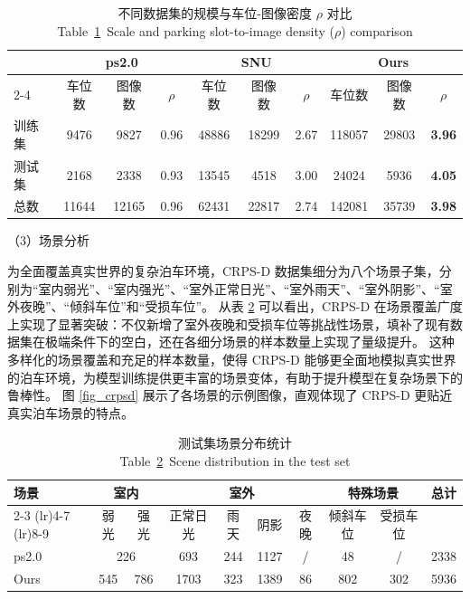 \begin{table}[!t]
\centering
\setlength{\tabcolsep}{1.5mm}
\caption{不同数据集的规模与车位-图像密度 $\rho$ 对比 \\Table~\ref{tab_density}~Scale and parking slot-to-image density ($\rho$) comparison }
\begin{tabular}{lccccccccc}
\toprule
 & \multicolumn{3}{c}{ps2.0\cite{zhang2018vision}} & \multicolumn{3}{c}{SNU\cite{do2020context}} & \multicolumn{3}{c}{Ours} \\\cmidrule{2-4}\cmidrule{5-7}\cmidrule{8-10}%
 
    & 车位数 & 图像数 & $\rho$ & 车位数 & 图像数 & $\rho$ & 车位数 & 图像数 & $\rho$ \\
\midrule
     训练集 & 9476 & 9827 & 0.96 & 48886 & 18299 & 2.67 & 118057 & 29803 & \textbf{3.96}  \\
    测试集 & 2168 & 2338 & 0.93 & 13545 & 4518 & 3.00 & 24024 & 5936 & \textbf{4.05}  \\
    总数 & 11644 & 12165 & 0.96 & 62431 & 22817 & 2.74 & 142081 & 35739 & \textbf{3.98}  \\
\bottomrule
\end{tabular}
\label{tab_density}
\end{table} 


（3）场景分析

为全面覆盖真实世界的复杂泊车环境，CRPS-D 数据集细分为八个场景子集，分别为“室内弱光”、“室内强光”、“室外正常日光”、“室外雨天”、“室外阴影”、“室外夜晚”、“倾斜车位”和“受损车位”。
从表 \ref{tab_sence} 可以看出，CRPS-D 在场景覆盖广度上实现了显著突破：不仅新增了室外夜晚和受损车位等挑战性场景，填补了现有数据集在极端条件下的空白，还在各细分场景的样本数量上实现了量级提升。
这种多样化的场景覆盖和充足的样本数量，使得 CRPS-D 能够更全面地模拟真实世界的泊车环境，为模型训练提供更丰富的场景变体，有助于提升模型在复杂场景下的鲁棒性。
图 \ref{fig_crpsd} 展示了各场景的示例图像，直观体现了 CRPS-D 更贴近真实泊车场景的特点。

\begin{table}[!h]
\centering
\setlength{\tabcolsep}{1.5mm}
\caption{测试集场景分布统计\\
Table~\ref{tab_sence}~Scene distribution in the test set}
\begin{tabular}{lccccccccc}
    \toprule
    \multirow{2}{*}{场景} & \multicolumn{2}{c}{室内} & \multicolumn{4}{c}{室外} & \multicolumn{2}{c}{特殊场景} & \multirow{2}{*}{总计} \\
    \cmidrule(lr){2-3} \cmidrule(lr){4-7} \cmidrule(lr){8-9}
    & 弱光 & 强光 & 正常日光 & 雨天 & 阴影 & 夜晚 & 倾斜车位 & 受损车位 & \\
    \midrule
    ps2.0\cite{zhang2018vision} & \multicolumn{2}{c}{226} & 693 & 244 & 1127 & / & 48 & / & 2338 \\
    Ours & 545 & 786 & 1703 & 323 & 1389 & 86 & 802 & 302 & 5936 \\
    \bottomrule
\end{tabular}
\label{tab_sence}
\end{table}


